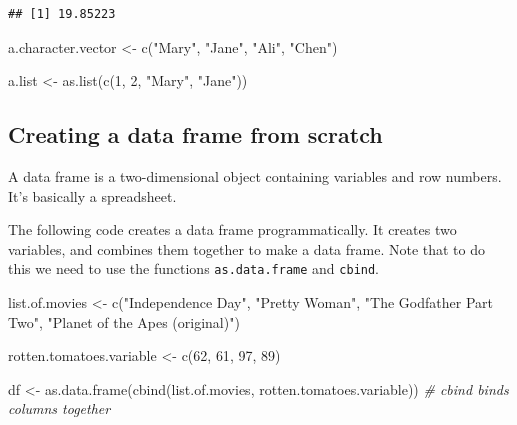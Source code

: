 \documentclass[]{article}
\newenvironment{Shaded}{\begin{snugshade}}{\end{snugshade}}
\newcommand{\CommentTok}[1]{\textcolor[rgb]{0.56,0.35,0.01}{\textit{#1}}}
\newcommand{\DecValTok}[1]{\textcolor[rgb]{0.00,0.00,0.81}{#1}}
\newcommand{\FunctionTok}[1]{\textcolor[rgb]{0.00,0.00,0.00}{#1}}
\newcommand{\NormalTok}[1]{#1}
\newcommand{\OtherTok}[1]{\textcolor[rgb]{0.56,0.35,0.01}{#1}}
\newcommand{\StringTok}[1]{\textcolor[rgb]{0.31,0.60,0.02}{#1}}
\begin{document}
\begin{verbatim}
## [1] 19.85223
\end{verbatim}

\begin{Shaded}
\begin{Highlighting}[]
\NormalTok{a.character.vector }\OtherTok{\textless{}{-}} \FunctionTok{c}\NormalTok{(}\StringTok{"Mary"}\NormalTok{, }\StringTok{"Jane"}\NormalTok{, }\StringTok{"Ali"}\NormalTok{, }\StringTok{"Chen"}\NormalTok{)}

\NormalTok{a.list }\OtherTok{\textless{}{-}} \FunctionTok{as.list}\NormalTok{(}\FunctionTok{c}\NormalTok{(}\DecValTok{1}\NormalTok{, }\DecValTok{2}\NormalTok{, }\StringTok{"Mary"}\NormalTok{, }\StringTok{"Jane"}\NormalTok{))}
\end{Highlighting}
\end{Shaded}

\hypertarget{creating-a-data-frame-from-scratch}{%
\subsection{Creating a data frame from
scratch}\label{creating-a-data-frame-from-scratch}}

A data frame is a two-dimensional object containing variables and row
numbers. It's basically a spreadsheet.

The following code creates a data frame programmatically. It creates two
variables, and combines them together to make a data frame. Note that to
do this we need to use the functions \texttt{as.data.frame} and
\texttt{cbind}.

\begin{Shaded}
\begin{Highlighting}[]
\NormalTok{list.of.movies }\OtherTok{\textless{}{-}} \FunctionTok{c}\NormalTok{(}\StringTok{"Independence Day"}\NormalTok{, }\StringTok{"Pretty Woman"}\NormalTok{, }\StringTok{"The Godfather Part}
\StringTok{Two"}\NormalTok{, }\StringTok{"Planet of the Apes (original)"}\NormalTok{)}

\NormalTok{rotten.tomatoes.variable }\OtherTok{\textless{}{-}} \FunctionTok{c}\NormalTok{(}\DecValTok{62}\NormalTok{, }\DecValTok{61}\NormalTok{, }\DecValTok{97}\NormalTok{, }\DecValTok{89}\NormalTok{)}

\NormalTok{df }\OtherTok{\textless{}{-}} \FunctionTok{as.data.frame}\NormalTok{(}\FunctionTok{cbind}\NormalTok{(list.of.movies, rotten.tomatoes.variable)) }\CommentTok{\# \textquotesingle{}cbind\textquotesingle{} binds columns together}
\end{Highlighting}
\end{Shaded}
\end{document}
